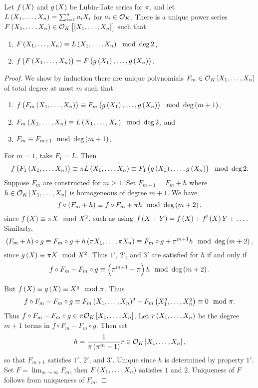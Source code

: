 \begin{lemma}
\label{lem:20.8}
Let $ f\br{X} $ and $ g\br{X} $ be Lubin-Tate series for $ \pi $, and let $ L\br{X_1, \dots, X_n} = \sum_{i = 1}^n a_iX_i $ for $ a_i \in \mathcal{O}_K $. There is a unique power series $ F\br{X_1, \dots, X_n} \in \OOO_K\sbr{\sbr{X_1, \dots, X_n}} $ such that
\begin{enumerate}
\item $ F\br{X_1, \dots, X_n} \equiv L\br{X_1, \dots, X_n} \mod \deg 2 $,
\item $ f\br{F\br{X_1, \dots, X_n}} = F\br{g\br{X_1}, \dots, g\br{X_n}} $.
\end{enumerate}
\end{lemma}

\begin{proof}
We show by induction there are unique polynomials $ F_m \in \OOO_K\sbr{X_1, \dots, X_n} $ of total degree at most $ m $ such that
\begin{enumerate}[label=\arabic*$ ' $.]
\item $ f\br{F_m\br{X_1, \dots, X_n}} \equiv F_m\br{g\br{X_1}, \dots, g\br{X_n}} \mod \deg \br{m + 1} $,
\item $ F_m\br{X_1, \dots, X_n} \equiv L\br{X_1, \dots, X_n} \mod \deg 2 $, and
\item $ F_m \equiv F_{m + 1} \mod \deg \br{m + 1} $.
\end{enumerate}
For $ m = 1 $, take $ F_1 = L $. Then
$$ f\br{F_1\br{X_1, \dots, X_n}} \equiv \pi L\br{X_1, \dots, X_n} \equiv F_1\br{g\br{X_1}, \dots, g\br{X_n}} \mod \deg 2. $$
Suppose $ F_m $ are constructed for $ m \ge 1 $. Set $ F_{m + 1} = F_m + h $ where $ h \in \OOO_K\sbr{X_1, \dots, X_n} $ is homogeneous of degree $ m + 1 $. We have
$$ f \circ \br{F_m + h} \equiv f \circ F_m + \pi h \mod \deg \br{m + 2}, $$
since $ f\br{X} \equiv \pi X \mod X^2 $, such as using $ f\br{X + Y} = f\br{X} + f'\br{X}Y + \dots $. Similarly,
$$ \br{F_m + h} \circ g \equiv F_m \circ g + h\br{\pi X_1, \dots, \pi X_n} \equiv F_m \circ g + \pi^{m + 1}h \mod \deg \br{m + 2}, $$
since $ g\br{X} \equiv \pi X \mod X^2 $. Thus $ 1' $, $ 2' $, and $ 3' $ are satisfied for $ h $ if and only if
$$ f \circ F_m - F_m \circ g \equiv \br{\pi^{m + 1} - \pi}h \mod \deg \br{m + 2}. $$

\pagebreak

But $ f\br{X} \equiv g\br{X} \equiv X^q \mod \pi $. Thus
$$ f \circ F_m - F_m \circ g \equiv F_m\br{X_1, \dots, X_n}^q - F_m\br{X_1^q, \dots, X_n^q} \equiv 0 \mod \pi. $$
Thus $ f \circ F_m - F_m \circ g \in \pi\OOO_K\sbr{X_1, \dots, X_n} $. Let $ r\br{X_1, \dots, X_n} $ be the degree $ m + 1 $ terms in $ f \circ F_m - F_m \circ g $. Then set
$$ h = \dfrac{1}{\pi\br{\pi^m - 1}}r \in \OOO_K\sbr{X_1, \dots, X_n}, $$
so that $ F_{m + 1} $ satisfies $ 1' $, $ 2' $, and $ 3' $. Unique since $ h $ is determined by property $ 1' $. Set $ F = \lim_{m \to \infty} F_m $, then $ F\br{X_1, \dots, X_n} $ satisfies $ 1 $ and $ 2 $. Uniqueness of $ F $ follows from uniqueness of $ F_m $.
\end{proof}

